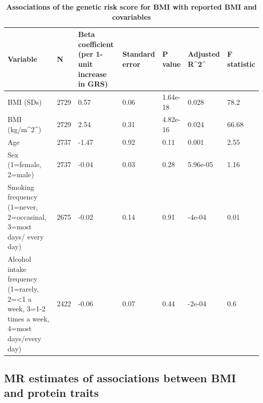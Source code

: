\documentclass[11pt,twoside]{bristolthesis}
\begin{document}
\begin{landscape}\begin{table}

\caption[Associations of the genetic risk score for BMI with reported BMI and covariables]{\label{tab:INT-GRS-confounders}\textbf{Associations of the genetic risk score for BMI with reported BMI and covariables}}
\centering
\begin{tabu} to 
\toprule
Variable & N & Beta coefficient (per 1-unit increase in GRS) & Standard error & P value & Adjusted R\textasciicircum{}2\textasciicircum{} & F statistic\\
\midrule
BMI (SDs) & 2729 & 0.57 & 0.06 & 1.64e-18 & 0.028 & 78.2\\
BMI (kg/m\textasciicircum{}2\textasciicircum{}) & 2729 & 2.54 & 0.31 & 4.82e-16 & 0.024 & 66.68\\
Age & 2737 & -1.47 & 0.92 & 0.11 & 0.001 & 2.55\\
Sex (1=female, 2=male) & 2737 & -0.04 & 0.03 & 0.28 & 5.96e-05 & 1.16\\
Smoking frequency (1=never, 2=occasinal, 3=most days/ every day) & 2675 & -0.02 & 0.14 & 0.91 & -4e-04 & 0.01\\
\addlinespace
Alcohol intake frequency (1=rarely, 2=<1 a week, 3=1-2 times a week, 4=most days/every day) & 2422 & -0.06 & 0.07 & 0.44 & -2e-04 & 0.6\\
\bottomrule
\end{tabu}
\end{table}
\end{landscape}
\hypertarget{mr-estimates-of-associations-between-bmi-and-protein-traits}{%
\subsection{MR estimates of associations between BMI and protein traits}\label{mr-estimates-of-associations-between-bmi-and-protein-traits}}
\end{document}
